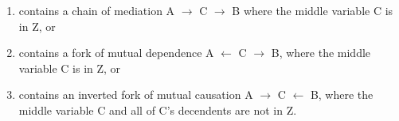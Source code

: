 \begin{enumerate} 
\item contains a chain of mediation A $\rightarrow$ C $\rightarrow$  B where the middle variable C is in Z, or
\item contains a fork of mutual dependence A $\leftarrow$ C $\rightarrow$ B, where the middle variable C is in Z, or
\item contains an inverted fork of mutual causation A $\rightarrow$ C $\leftarrow$  B, where the middle variable C and all of C's decendents are not in Z.
\end{enumerate}

\nocite{Morgan.2014}
\nocite{Pearl.2009}





